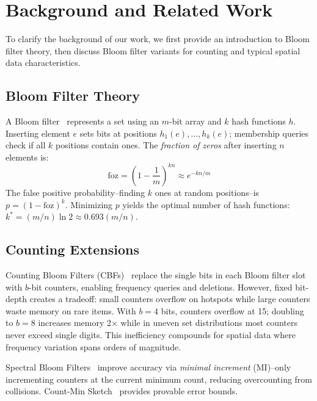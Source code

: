 \documentclass[agile, final]{copernicus-agile}
\begin{document}
\section{Background and Related Work}
\label{sec:background}
To clarify the background of our work, we first provide an introduction to Bloom filter theory, then discuss Bloom filter variants for counting and typical spatial data characteristics.

\subsection{Bloom Filter Theory}
A Bloom filter~\citep{bloom_space/time_1970} represents a set using an $m$-bit array and $k$ hash functions $h$. Inserting element $e$ sets bits at positions $h_1(e), \ldots, h_k(e)$; membership queries check if all $k$ positions contain ones. The \emph{fraction of zeros} after inserting $n$ elements is:
\begin{equation}
\text{foz} = \left(1 - \frac{1}{m}\right)^{kn} \approx e^{-kn/m}
\end{equation}
The false positive probability--finding $k$ ones at random positions--is $p = (1 - \text{foz})^k$. Minimizing $p$ yields the optimal number of hash functions: $k^* = (m/n) \ln 2 \approx 0.693(m/n)$.

\subsection{Counting Extensions}

Counting Bloom Filters (CBFs)~\citep{fan2000summary} replace the single bits in each Bloom filter slot with $b$-bit counters, enabling frequency queries and deletions. However, fixed bit-depth creates a tradeoff: small counters overflow on hotspots while large counters waste memory on rare items. With $b=4$ bits, counters overflow at 15; doubling to $b=8$ increases memory 2$\times$ while in uneven set distributions most counters never exceed single digits. This inefficiency compounds for spatial data where frequency variation spans orders of magnitude.

Spectral Bloom Filters~\citep{cohen2003spectral} improve accuracy via \emph{minimal increment} (MI)--only incrementing counters at the current minimum count, reducing overcounting from collisions. Count-Min Sketch~\citep{cormode2005improved} provides provable error bounds.%
\end{document}
